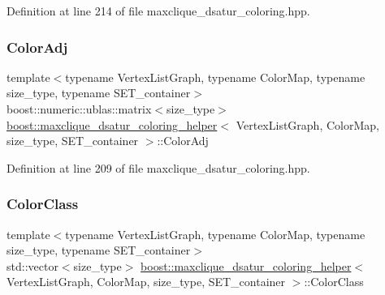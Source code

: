 Definition at line 214 of file maxclique\+\_\+dsatur\+\_\+coloring.\+hpp.

\mbox{\label{classboost_1_1maxclique__dsatur__coloring__helper_a448f9ff26409faef73fa41e6c59c9cfe}} 
\subsubsection{\texorpdfstring{Color\+Adj}{ColorAdj}}
{\footnotesize\ttfamily template$<$typename Vertex\+List\+Graph, typename Color\+Map, typename size\+\_\+type, typename S\+E\+T\+\_\+container$>$ \\
boost\+::numeric\+::ublas\+::matrix$<$size\+\_\+type$>$ \hyperlink{classboost_1_1maxclique__dsatur__coloring__helper}{boost\+::maxclique\+\_\+dsatur\+\_\+coloring\+\_\+helper}$<$ Vertex\+List\+Graph, Color\+Map, size\+\_\+type, S\+E\+T\+\_\+container $>$\+::Color\+Adj\hspace{0.3cm}{\ttfamily [private]}}



Definition at line 209 of file maxclique\+\_\+dsatur\+\_\+coloring.\+hpp.

\mbox{\label{classboost_1_1maxclique__dsatur__coloring__helper_a60b34646f3805dd544857d2ce82a1397}} 
\subsubsection{\texorpdfstring{Color\+Class}{ColorClass}}
{\footnotesize\ttfamily template$<$typename Vertex\+List\+Graph, typename Color\+Map, typename size\+\_\+type, typename S\+E\+T\+\_\+container$>$ \\
std\+::vector$<$size\+\_\+type$>$ \hyperlink{classboost_1_1maxclique__dsatur__coloring__helper}{boost\+::maxclique\+\_\+dsatur\+\_\+coloring\+\_\+helper}$<$ Vertex\+List\+Graph, Color\+Map, size\+\_\+type, S\+E\+T\+\_\+container $>$\+::Color\+Class\hspace{0.3cm}{\ttfamily [private]}}



